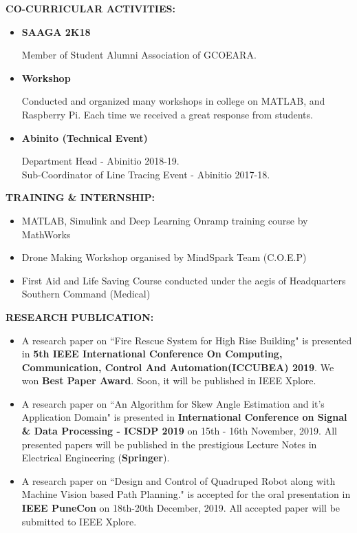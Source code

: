 \documentclass[a4paper, 10pt]{article}
\begin{document}
{\textbf{\Large{CO-CURRICULAR ACTIVITIES:}}}
\begin{itemize}
\item \textbf{SAAGA 2K18}

Member of Student Alumni Association of GCOEARA.
\item \textbf{Workshop}

Conducted and organized many workshops in college on MATLAB, and Raspberry Pi. Each time we received a great response from students.
\item \textbf{Abinito (Technical Event)}

Department Head - Abinitio 2018-19.\\
Sub-Coordinator of Line Tracing Event - Abinitio 2017-18.\\ 


\end{itemize}

{\textbf{\Large{TRAINING \& INTERNSHIP:}}}
\begin{itemize}
\item MATLAB, Simulink and Deep Learning Onramp training course by MathWorks
\item Drone Making Workshop organised by MindSpark Team (C.O.E.P)
\item First Aid and Life Saving Course conducted under the aegis of Headquarters Southern Command (Medical)\\
\end{itemize}

{\textbf{\Large{RESEARCH PUBLICATION:}}}
\begin{itemize}
\item A research paper on ``Fire Rescue System for High Rise Building" is presented in \textbf{5th IEEE International Conference On Computing, Communication, Control And Automation(ICCUBEA) 2019}. We won \textbf{Best Paper Award}. Soon, it will be published in IEEE Xplore.
\item A research paper on ``An Algorithm for Skew Angle Estimation and it's Application Domain" is presented in \textbf{International Conference on Signal \& Data Processing - ICSDP 2019} on 15th - 16th  November, 2019. All presented papers will be published in the prestigious Lecture Notes in Electrical Engineering (\textbf{Springer}).
\item A research paper on ``Design and Control of Quadruped Robot along with Machine Vision based Path Planning." is accepted for the oral presentation in \textbf{IEEE PuneCon} on 18th-20th December, 2019. All accepted paper will be submitted to IEEE Xplore.\\
\end{itemize}
\end{document}
